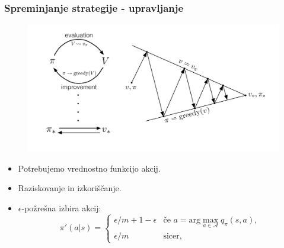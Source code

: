 \documentclass{beamer}    %
\begin{document}
\begin{frame}
    \frametitle{Spreminjanje strategije - upravljanje}
    \begin{figure}
        \includegraphics[scale=0.2]{slike/policy-iteration.png}
    \end{figure}
    \pause
    \begin{itemize}
        \item Potrebujemo vrednostno funkcijo akcij. 
        \item Raziskovanje in izkoriščanje.
        \item $\epsilon$-požrešna izbira akcij:
        \begin{equation*}
            \pi'(a|s) = \begin{cases}
                \epsilon / m + 1 - \epsilon & \text{če } a = \text{arg}\max_{a \in 
                    \mathcal{A}} q_\pi(s, a), \\
                    \epsilon / m & \text{sicer},
               \end{cases}
        \end{equation*}
    \end{itemize}
\end{frame}
\end{document}
